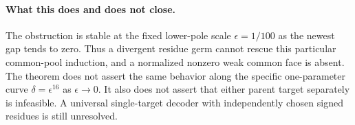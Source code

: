 \documentclass[11pt]{article}
\begin{document}
\paragraph{What this does and does not close.}
The obstruction is stable at the fixed lower-pole scale
$\epsilon=1/100$ as the newest gap tends to zero. Thus a divergent
residue germ cannot rescue this particular common-pool induction,
and a normalized nonzero weak common face is absent. The theorem
does not assert the same behavior along the specific one-parameter
curve $\delta=\epsilon^{16}$ as $\epsilon\to0$. It also does not
assert that either parent target separately is infeasible. A universal
single-target decoder with independently chosen signed residues is
still unresolved.
\end{document}
